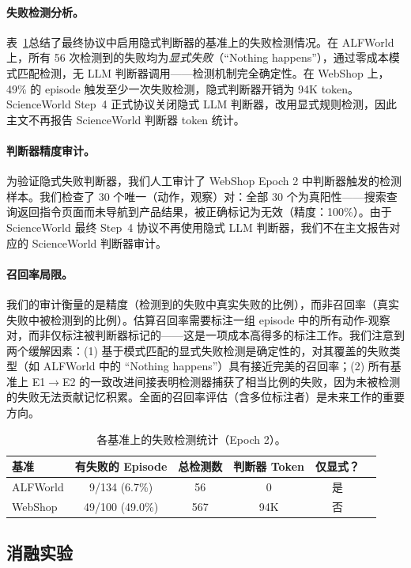 \documentclass[11pt,a4paper]{article}
\begin{document}
\paragraph{失败检测分析。} 表~\ref{tab:detection_stats}总结了最终协议中启用隐式判断器的基准上的失败检测情况。在 ALFWorld 上，所有 56 次检测到的失败均为\emph{显式失败}（``Nothing happens''），通过零成本模式匹配检测，无 LLM 判断器调用——检测机制完全确定性。在 WebShop 上，49\% 的 episode 触发至少一次失败检测，隐式判断器开销为 94K token。ScienceWorld Step~4 正式协议关闭隐式 LLM 判断器，改用显式规则检测，因此主文不再报告 ScienceWorld 判断器 token 统计。

\paragraph{判断器精度审计。} 为验证隐式失败判断器，我们人工审计了 WebShop Epoch 2 中判断器触发的检测样本。我们检查了 30 个唯一（动作，观察）对：全部 30 个为真阳性——搜索查询返回指令页面而未导航到产品结果，被正确标记为无效（精度：100\%）。由于 ScienceWorld 最终 Step~4 协议不再使用隐式 LLM 判断器，我们不在主文报告对应的 ScienceWorld 判断器审计。

\paragraph{召回率局限。} 我们的审计衡量的是精度（检测到的失败中真实失败的比例），而非召回率（真实失败中被检测到的比例）。估算召回率需要标注一组 episode 中的所有动作-观察对，而非仅标注被判断器标记的——这是一项成本高得多的标注工作。我们注意到两个缓解因素：(1) 基于模式匹配的显式失败检测是确定性的，对其覆盖的失败类型（如 ALFWorld 中的 ``Nothing happens''）具有接近完美的召回率；(2) 所有基准上 E1$\to$E2 的一致改进间接表明检测器捕获了相当比例的失败，因为未被检测的失败无法贡献记忆积累。全面的召回率评估（含多位标注者）是未来工作的重要方向。

\begin{table}[h]
\centering
\caption{各基准上的失败检测统计（Epoch 2）。}
\label{tab:detection_stats}
\small
\begin{tabular}{lccccc}
\toprule
基准 & 有失败的 Episode & 总检测数 & 判断器 Token & 仅显式？ \\
\midrule
ALFWorld & 9/134 (6.7\%) & 56 & 0 & 是 \\
WebShop & 49/100 (49.0\%) & 567 & 94K & 否 \\
\bottomrule
\end{tabular}
\end{table}

\subsection{消融实验}
\label{sec:ablation}
\end{document}
